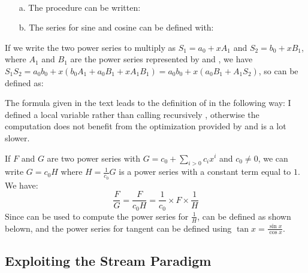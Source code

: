 \begin{exe}[3.59]
    \ \vspace{-20pt}
    \begin{itemize}
	\item[a.] The procedure  can be written:
	\item[b.] The series for sine and cosine can be defined with:
    \end{itemize}
\end{exe}

\begin{exe}[3.60]
    If we write the two power series to multiply as $S_1 = a_0 + x A_1$ and $S_2 
    = b_0 + x B_1$, where $A_1$ and $B_1$ are the power series represented by
     and , we have
    $S_1 S_2 = a_0 b_0 + x (b_0 A_1 + a_0 B_1 + x A_1 B_1)
    = a_0 b_0 + x (a_0 B_1 + A_1 S_2)$, so  can be defined as:
\end{exe}

\begin{exe}[3.61]
    The formula given in the text leads to the definition of 
     in the following way:
    I defined a local variable rather than calling recursively 
    , otherwise the computation does not benefit from 
    the optimization provided by  and is a lot slower.
\end{exe}

\begin{exe}[3.62]
    If $F$ and $G$ are two power series with $G = c_0 + \sum_{i > 0} c_i x^i$ 
    and $c_0 \neq 0$, we can write $G = c_0 H$ where $H = \frac{1}{c_0} G$ is 
    a power series with a constant term equal to $1$. We have:
    \[
    \frac{F}{G} = \frac{F}{c_0 H} = \frac{1}{c_0} \times F \times \frac{1}{H}
    \]
    Since  can be used to compute the power series for 
    $\frac{1}{H}$,  can be defined as shown belown, and the 
    power series for tangent can be defined using $\tan x = \frac{\sin x}{\cos 
    x}$.
\end{exe}

\subsection{Exploiting the Stream Paradigm}

